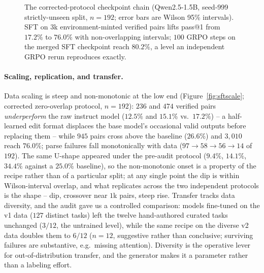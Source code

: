 \documentclass{article}
\begin{document}
\begin{figure}[t]
\centering
{}
\caption{The corrected-protocol checkpoint chain (Qwen2.5-1.5B, seed-999 strictly-unseen split, $n{=}192$; error bars are Wilson 95\% intervals). SFT on $3$k environment-minted verified pairs lifts pass@1 from $17.2\%$ to $76.0\%$ with non-overlapping intervals; $100$ GRPO steps on the merged SFT checkpoint reach $80.2\%$, a level an independent GRPO rerun reproduces exactly.}
\label{fig:chain}
\end{figure}

\paragraph{Scaling, replication, and transfer.} Data scaling is steep and non-monotonic at the low end (Figure~\ref{fig:sftscale}; corrected zero-overlap protocol, $n{=}192$): $236$ and $474$ verified pairs \emph{underperform} the raw instruct model ($12.5\%$ and $15.1\%$ vs.\ $17.2\%$) -- a half-learned edit format displaces the base model's occasional valid outputs before replacing them -- while $945$ pairs cross above the baseline ($26.6\%$) and $3{,}010$ reach $76.0\%$; parse failures fall monotonically with data ($97\to58\to56\to14$ of $192$). The same U-shape appeared under the pre-audit protocol ($9.4\%$, $14.1\%$, $34.4\%$ against a $25.0\%$ baseline), so the non-monotonic onset is a property of the recipe rather than of a particular split; at any single point the dip is within Wilson-interval overlap, and what replicates across the two independent protocols is the shape -- dip, crossover near $1$k pairs, steep rise. Transfer tracks data diversity, and the audit gave us a controlled comparison: models fine-tuned on the v1 data ($127$ distinct tasks) left the twelve hand-authored curated tasks unchanged ($3/12$, the untrained level), while the same recipe on the diverse v2 data doubles them to $6/12$ ($n{=}12$, suggestive rather than conclusive; surviving failures are substantive, e.g.\ missing attention). Diversity is the operative lever for out-of-distribution transfer, and the generator makes it a parameter rather than a labeling effort.
\end{document}
